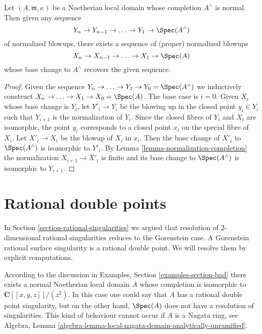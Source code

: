 \begin{lemma}
\label{lemma-normalized-blowup-completion}
Let $(A, \mathfrak m, \kappa)$ be a Noetherian local domain whose completion
$A^\wedge$ is normal. Then given any sequence
$$
Y_n \to Y_{n - 1} \to \ldots \to Y_1 \to \Spec(A^\wedge)
$$
of normalized blowups, there exists a sequence of (proper) normalized blowups
$$
X_n \to X_{n - 1} \to \ldots \to X_1 \to \Spec(A)
$$
whose base change to $A^\wedge$ recovers the given sequence.
\end{lemma}

\begin{proof}
Given the sequence $Y_n \to \ldots \to Y_1 \to Y_0 = \Spec(A^\wedge)$ we
inductively construct $X_n \to \ldots \to X_1 \to X_0 = \Spec(A)$.
The base case is $i = 0$. Given $X_i$ whose base change is $Y_i$,
let $Y'_i \to Y_i$ be the blowing up in the closed point $y_i \in Y_i$
such that $Y_{i + 1}$ is the normalization of $Y_i$.
Since the closed fibres of $Y_i$ and $X_i$ are isomorphic, the point
$y_i$ corresponds to a closed point $x_i$ on the special fibre of $X_i$.
Let $X'_i \to X_i$ be the blowup of $X_i$ in $x_i$. Then the base change
of $X'_i$ to $\Spec(A^\wedge)$ is isomorphic to $Y'_i$. 
By Lemma \ref{lemma-normalization-completion}
the normalization $X_{i + 1} \to X'_i$ is finite and its base change
to $\Spec(A^\wedge)$ is isomorphic to $Y_{i + 1}$.
\end{proof}














\section{Rational double points}
\label{section-rational-double-points}

\noindent
In Section \ref{section-rational-singularities}
we argued that resolution of $2$-dimensional
rational singularities reduces to the Gorenstein case.
A Gorenstein rational surface singularity is a rational double point.
We will resolve them by explicit computations.

\medskip\noindent
According to the discussion in Examples, Section \ref{examples-section-bad}
there exists a normal Noetherian local domain $A$ whose completion
is isomorphic to $\mathbf{C}[[x, y, z]]/(z^2)$. In this case one could
say that $A$ has a rational double point singularity, but on the other
hand, $\Spec(A)$ does not have a resolution of singularities.
This kind of behaviour cannot occur if $A$ is a Nagata ring, see
Algebra, Lemma \ref{algebra-lemma-local-nagata-domain-analytically-unramified}.

